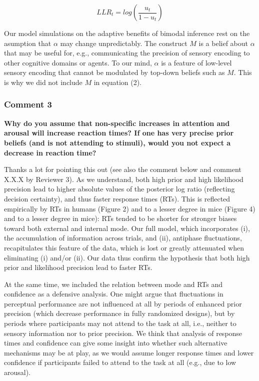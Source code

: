\documentclass[
]{article}
\begin{document}
\begin{equation}
LLR_t = log(\frac{u_t}{1-u_t})
\end{equation}

Our model simulations on the adaptive benefits of bimodal inference rest
on the asumption that \(\alpha\) may change unpredictably. The construct
\(M\) is a belief about \(\alpha\) that may be useful for, e.g.,
communicating the precision of sensory encoding to other cognitive
domains or agents. To our mind, \(\alpha\) is a feature of low-level
sensory encoding that cannot be modulated by top-down beliefs such as
\(M\). This is why we did not include \(M\) in equation (2).

\hypertarget{comment-3}{%
\subsubsection{Comment 3}\label{comment-3}}

\textbf{Why do you assume that non-specific increases in attention and
arousal will increase reaction times? If one has very precise prior
beliefs (and is not attending to stimuli), would you not expect a
decrease in reaction time?}

Thanks a lot for pointing this out (see also the comment below and
comment X.X.X by Reviewer 3). As we understand, both high prior and high
likelihood precision lead to higher absolute values of the posterior log
ratio (reflecting decision certainty), and thus faster response times
(RTs). This is reflected empirically by RTs in humans (Figure 2) and to
a lesser degree in mice (Figure 4) and to a lesser degree in mice): RTs
tended to be shorter for stronger biases toward both external and
internal mode. Our full model, which incorporates (i), the accumulation
of information across trials, and (ii), antiphase fluctuations,
recapitulates this feature of the data, which is lost or greatly
attenuated when eliminating (i) and/or (ii). Our data thus confirm the
hypothesis that both high prior and likelihood precision lead to faster
RTs.

At the same time, we included the relation between mode and RTs and
confidence as a defensive analysis. One might argue that fluctuations in
perceptual performance are not influenced at all by periods of enhanced
prior precision (which decrease performance in fully randomized
designs), but by periods where participants may not attend to the task
at all, i.e., neither to sensory information nor to prior precision. We
think that analysis of response times and confidence can give some
insight into whether such alternative mechanisms may be at play, as we
would assume longer response times and lower confidence if participants
failed to attend to the task at all (e.g., due to low arousal).
\end{document}
